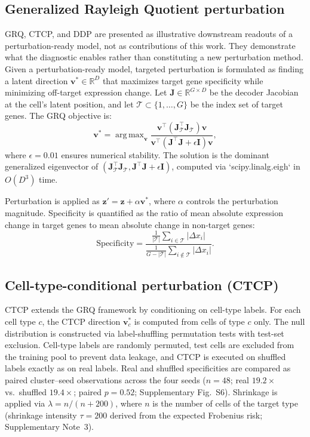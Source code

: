 \documentclass[11 pt,a4 paper]{article}
\DeclareMathOperator*{\argmax}{arg\,max}\DeclareMathOperator*{\argmin}{arg\,min}
\begin{document}
\subsection*{Generalized Rayleigh Quotient perturbation}

GRQ, CTCP, and DDP are presented as illustrative downstream readouts of a perturbation-ready model, not as contributions of this work. They demonstrate what the diagnostic enables rather than constituting a new perturbation method. Given a perturbation-ready model, targeted perturbation is formulated as finding a latent direction $\mathbf{v}^* \in \mathbb{R}^D$ that maximizes target gene specificity while minimizing off-target expression change. Let $\mathbf{J} \in \mathbb{R}^{G \times D}$ be the decoder Jacobian at the cell's latent position, and let $\mathcal{T} \subset \{1,\ldots,G\}$ be the index set of target genes. The GRQ objective is:
\begin{equation}
\mathbf{v}^* = \argmax_{\mathbf{v}} \frac{\mathbf{v}^\top (\mathbf{J}_{\mathcal{T}}^\top \mathbf{J}_{\mathcal{T}}) \mathbf{v}}{\mathbf{v}^\top (\mathbf{J}^\top\mathbf{J} + \epsilon\mathbf{I}) \mathbf{v}},
\end{equation}
where $\epsilon=0.01$ ensures numerical stability. The solution is the dominant generalized eigenvector of $(\mathbf{J}_{\mathcal{T}}^\top\mathbf{J}_{\mathcal{T}}, \mathbf{J}^\top\mathbf{J} + \epsilon\mathbf{I})$, computed via `scipy.linalg.eigh` in $O(D^3)$ time.

Perturbation is applied as $\mathbf{z}' = \mathbf{z} + \alpha\mathbf{v}^*$, where $\alpha$ controls the perturbation magnitude. Specificity is quantified as the ratio of mean absolute expression change in target genes to mean absolute change in non-target genes:
\begin{equation}
\text{Specificity} = \frac{\frac{1}{|\mathcal{T}|}\sum_{i\in\mathcal{T}}|\Delta x_i|}{\frac{1}{G-|\mathcal{T}|}\sum_{i\notin\mathcal{T}}|\Delta x_i|}.
\end{equation}

\subsection*{Cell-type-conditional perturbation (CTCP)}

CTCP extends the GRQ framework by conditioning on cell-type labels. For each cell type $c$, the CTCP direction $\mathbf{v}^*_c$ is computed from cells of type $c$ only. The null distribution is constructed via label-shuffling permutation tests with test-set exclusion. Cell-type labels are randomly permuted, test cells are excluded from the training pool to prevent data leakage, and CTCP is executed on shuffled labels exactly as on real labels. Real and shuffled specificities are compared as paired cluster--seed observations across the four seeds ($n=48$; real $19.2\times$ vs.\ shuffled $19.4\times$; paired $p=0.52$; Supplementary Fig.~S6). Shrinkage is applied via $\lambda = n/(n+200)$, where $n$ is the number of cells of the target type (shrinkage intensity $\tau=200$ derived from the expected Frobenius risk; Supplementary Note~3).
\end{document}
